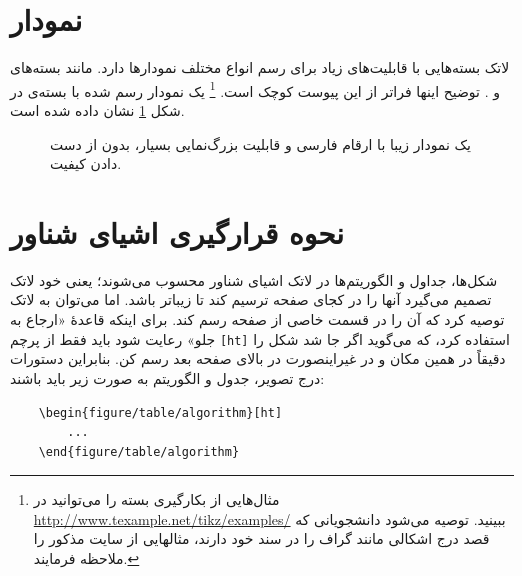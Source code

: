 \section{نمودار}
لاتک بسته‌هایی با قابلیت‌های زیاد برای رسم انواع مختلف نمودارها دارد. مانند بسته‌های  و  . توضیح اینها فراتر از این پیوست کوچک است.%
\footnote{
مثال‌هایی از بکارگیری بسته
را می‌توانید در
\url{http://www.texample.net/tikz/examples/}
ببینید. توصیه می‌شود دانشجویانی که قصد درج اشکالی مانند گراف را در سند خود دارند، مثالهایی از سایت مذکور را ملاحظه فرمایند.
}
یک نمودار رسم شده با بسته‌ی 
 در شکل 
\ref{fig:parabola}
نشان داده شده است.
\begin{figure}[t]
\centering
{}
\caption{یک نمودار زیبا با ارقام فارسی و قابلیت بزرگ‌نمایی بسیار، بدون از دست دادن کیفیت.}
\label{fig:parabola}
\end{figure}

\section{نحوه قرارگیری اشیای شناور}
\label{sec:floatObjs}
شکل‌ها، جداول و الگوریتم‌ها در لاتک اشیای شناور محسوب می‌شوند؛ یعنی خود لاتک تصمیم می‌گیرد آنها را در کجای صفحه ترسیم کند تا زیباتر باشد. اما می‌توان به لاتک توصیه کرد که آن را در قسمت خاصی از صفحه رسم کند. برای اینکه قاعدهٔ «ارجاع به جلو» رعایت شود باید فقط از پرچم
\verb|[ht]|
استفاده کرد، که می‌گوید اگر جا شد شکل را دقیقاً در همین مکان و در غیراینصورت در بالای صفحه بعد رسم کن.
بنابراین دستورات درج تصویر، جدول و الگوریتم به صورت زیر باید باشند:

\begin{latin}
\begin{verbatim}
	\begin{figure/table/algorithm}[ht]
		...
	\end{figure/table/algorithm}
\end{verbatim}
\end{latin}
